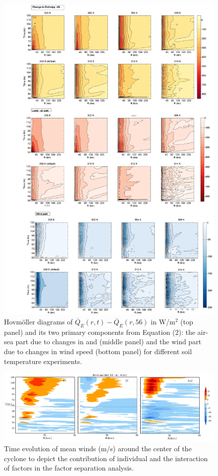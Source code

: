 \documentclass[fleqn,10pt]{wlscirep}
\begin{document}
\begin{figure}[ht]
\centering
\includegraphics[width=\textwidth, height=\textheight]{dQ_WP_TD}
\caption{Hovmöller diagrams of \(\overline{Q}_E(r,t)-\overline{Q}_E(r,56)\) in W/m$^{2}$ (top panel) and its two primary components from Equation (2): the air-sea part due to changes in  and (middle panel) and the wind part due to changes in wind speed (bottom panel) for different soil temperature experiments.}
\label{fig:enthalpy}
\end{figure}

\begin{figure}[ht]
\centering
\includegraphics[width=\linewidth]{facsep_mean_winds-2fac}
\caption{Time evolution of mean winds (m/s) around the center of the cyclone to depict the contribution of individual and the interaction of factors in the factor separation analysis.}
\label{fig:facsep_ideal}
\end{figure}
\end{document}
